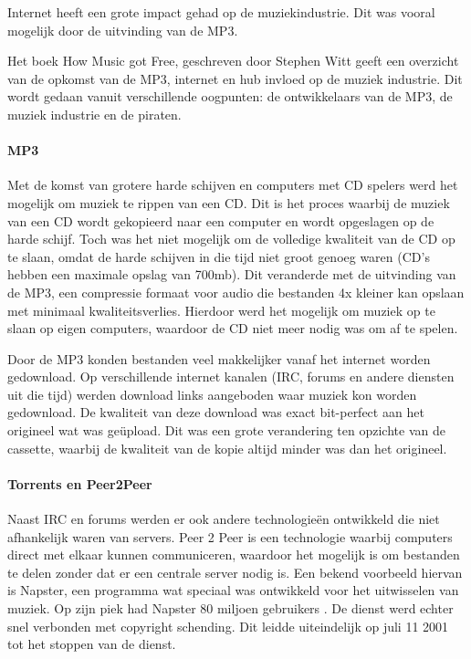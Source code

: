 Internet heeft een grote impact gehad op de muziekindustrie. Dit was vooral mogelijk door de uitvinding van de MP3.

Het boek How Music got Free, geschreven door Stephen Witt \citep{HowMusicGotFree} geeft een overzicht van de opkomst van de MP3, internet en hub invloed op de muziek industrie. Dit wordt gedaan vanuit verschillende oogpunten: de ontwikkelaars van de MP3, de muziek industrie en de piraten. 

\paragraph*{MP3}
Met de komst van grotere harde schijven en computers met CD spelers werd het mogelijk om muziek te rippen van een CD. Dit is het proces waarbij de muziek van een CD wordt gekopieerd naar een computer en wordt opgeslagen op de harde schijf. Toch was het niet mogelijk om de volledige kwaliteit van de CD op te slaan, omdat de harde schijven in die tijd niet groot genoeg waren (CD's hebben een maximale opslag van 700mb). Dit veranderde met de uitvinding van de MP3, een compressie formaat voor audio die bestanden 4x kleiner kan opslaan met minimaal kwaliteitsverlies. Hierdoor werd het mogelijk om muziek op te slaan op eigen computers, waardoor de CD niet meer nodig was om af te spelen. 

Door de MP3 konden bestanden veel makkelijker vanaf het internet worden gedownload. Op verschillende internet kanalen (IRC, forums en andere diensten uit die tijd) werden download links aangeboden waar muziek kon worden gedownload. De kwaliteit van deze download was exact bit-perfect aan het origineel wat was geüpload. Dit was een grote verandering ten opzichte van de cassette, waarbij de kwaliteit van de kopie altijd minder was dan het origineel.

\paragraph*{Torrents en Peer2Peer}
Naast IRC en forums werden er ook andere technologieën ontwikkeld die niet afhankelijk waren van servers. Peer 2 Peer is een technologie waarbij computers direct met elkaar kunnen communiceren, waardoor het  mogelijk is om bestanden te delen zonder dat er een centrale server nodig is. Een bekend voorbeeld hiervan is Napster, een programma wat speciaal was ontwikkeld voor het uitwisselen van muziek. Op zijn piek had Napster 80 miljoen gebruikers \citep{gown2002requiem}. De dienst werd echter snel verbonden met copyright schending. Dit leidde uiteindelijk op juli 11 2001 tot het stoppen van de dienst.

